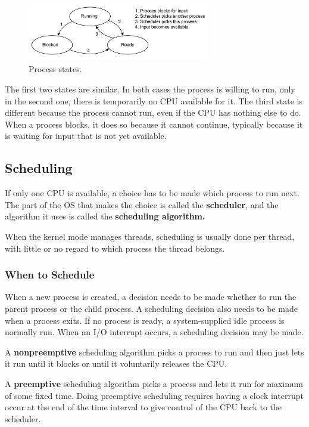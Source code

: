 \documentclass[11pt,a4paper]{article}
\begin{document}
\begin{figure}[h!]
	\centering
		\includegraphics[width=300px]{img/pro-01.png}
	\caption{Process states.}
\end{figure}

The first two states are similar. In both cases the process is willing to run, only in the second one, there is temporarily no CPU available for it. The third state is different because the process cannot run, even if the CPU has nothing else to do. When a process blocks, it does so because it cannot continue, typically because it is waiting for input that is not yet available.

\subsection{Scheduling}
If only one CPU is available, a choice has to be made which process to run next. The part of the OS that makes the choice  is called the \textbf{scheduler}, and the algorithm it uses is called the \textbf{scheduling algorithm.}

When the kernel mode manages threads, scheduling is usually done per thread, with little or no regard to which process the thread belongs. 

\subsubsection{When to Schedule}
When a new process is created, a decision needs to be made whether to run the parent process or the child process. A scheduling decision also needs to be made when a process exits. If no process is ready, a system-supplied idle process is normally run.
When an I/O interrupt occurs, a scheduling decision may be made. 

A \textbf{nonpreemptive} scheduling algorithm picks a process to run and then just lets it run until it blocks or until it voluntarily releases the CPU.

A \textbf{preemptive} scheduling algorithm picks a process and lets it run for maximum of some fixed time. Doing preemptive scheduling requires having a clock interrupt occur at the end of the time interval to give control of the CPU back to the scheduler.
\end{document}
